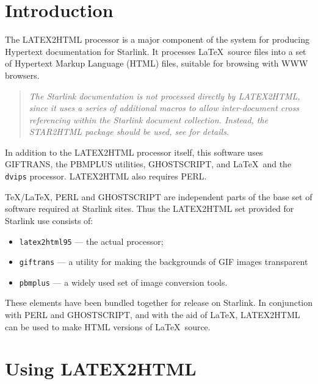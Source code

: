 \documentclass[twoside,11pt,nolof]{starlink}
\begin{document}
\scfrontmatter

\section{Introduction}

The LATEX2HTML processor is a major component of the system for producing
Hypertext documentation for Starlink.  It processes \LaTeX\ source files
into a set of Hypertext Markup Language (HTML) files, suitable for browsing
with WWW browsers.

\begin{quote}
\emph{The Starlink documentation is not processed directly by LATEX2HTML,
since it uses a series of additional macros to allow inter-document
cross referencing within the Starlink document collection.  Instead,
the STAR2HTML package should be used, see  for details.}
\end{quote}

In addition to the LATEX2HTML processor itself, this software uses
GIFTRANS, the PBMPLUS utilities, GHOSTSCRIPT, and \LaTeX\ and the \texttt{dvips} processor.  LATEX2HTML also requires PERL.

\TeX/\LaTeX, PERL and GHOSTSCRIPT are independent parts of the base set
of software required at Starlink sites.  Thus the LATEX2HTML set provided for
Starlink use consists of:

\begin{itemize}

\item \texttt{latex2html95} --- the actual processor;

\item \texttt{giftrans} --- a utility for making the backgrounds of GIF
images transparent

\item \texttt{pbmplus} --- a widely used set of image conversion tools.

\end{itemize}

These elements have been bundled together for release on Starlink.
In conjunction with PERL and GHOSTSCRIPT, and with the aid of \LaTeX,
LATEX2HTML can be used to make HTML versions of \LaTeX\ source.

\section{Using LATEX2HTML}
\end{document}
